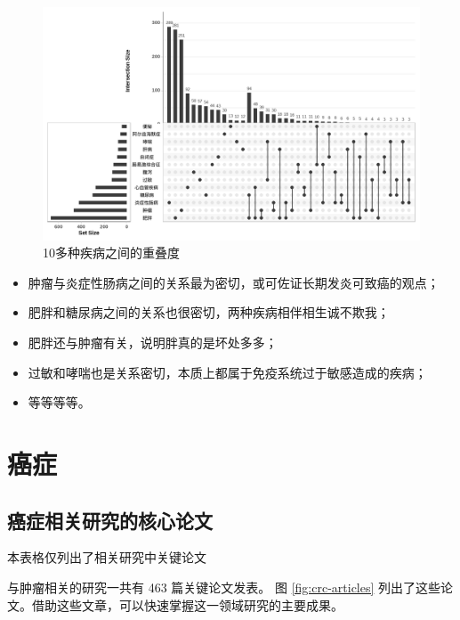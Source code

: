 \documentclass[]{ctexbook}
\providecommand{\tightlist}{%
  \setlength{\itemsep}{0pt}\setlength{\parskip}{0pt}}
\begin{document}
\begin{figure}
\includegraphics[width=1\linewidth]{plots/disease-overlap-1} \caption{10多种疾病之间的重叠度}\label{fig:disease-overlap}
\end{figure}

\begin{itemize}
\tightlist
\item
  肿瘤与炎症性肠病之间的关系最为密切，或可佐证长期发炎可致癌的观点；
\item
  肥胖和糖尿病之间的关系也很密切，两种疾病相伴相生诚不欺我；
\item
  肥胖还与肿瘤有关，说明胖真的是坏处多多；
\item
  过敏和哮喘也是关系密切，本质上都属于免疫系统过于敏感造成的疾病；
\item
  等等等等。
\end{itemize}

\hypertarget{cancer}{%
\section{癌症}\label{cancer}}

\hypertarget{ux764cux75c7ux76f8ux5173ux7814ux7a76ux7684ux6838ux5fc3ux8bbaux6587}{%
\subsection{癌症相关研究的核心论文}\label{ux764cux75c7ux76f8ux5173ux7814ux7a76ux7684ux6838ux5fc3ux8bbaux6587}}

\hypertarget{htmlwidget-3aa00e2861b089d5dc9d}{}

\label{fig:crc-articles}本表格仅列出了相关研究中关键论文

与肿瘤相关的研究一共有 463 篇关键论文发表。
图 \ref{fig:crc-articles} 列出了这些论文。借助这些文章，可以快速掌握这一领域研究的主要成果。
\end{document}
